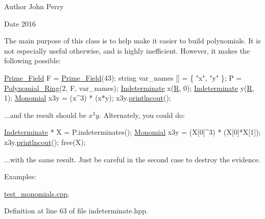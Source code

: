 \begin{DoxyAuthor}{Author}
John Perry
\end{DoxyAuthor}
\begin{DoxyDate}{Date}
2016
\end{DoxyDate}
The main purpose of this class is to help make it easier to build polynomials. It is not especially useful otherwise, and is highly inefficient. However, it makes the following possible\+: 
\begin{DoxyCode}
\hyperlink{group___fields_group_class_prime___field}{Prime\_Field} F = \hyperlink{group___fields_group_class_prime___field}{Prime\_Field}(43);
\textcolor{keywordtype}{string} var\_names [] = \{ \textcolor{stringliteral}{"x"}, \textcolor{stringliteral}{"y"} \};
P = \hyperlink{group__polygroup_class_polynomial___ring}{Polynomial\_Ring}(2, F, var\_names);
\hyperlink{group__polygroup_class_indeterminate}{Indeterminate} x(\hyperlink{group__polygroup_a78f5339712602f11e29a091d228032c4}{R}, 0);
\hyperlink{group__polygroup_class_indeterminate}{Indeterminate} y(\hyperlink{group__polygroup_a78f5339712602f11e29a091d228032c4}{R}, 1);
\hyperlink{group__polygroup_class_monomial}{Monomial} x3y = (x^3) * (x*y);
x3y.\hyperlink{group__polygroup_a339f1927077ab6d92b050d222d945f72}{printlncout}();
\end{DoxyCode}
 {$\dots$}and the result should be $x^3y$. Alternately, you could do\+: 
\begin{DoxyCode}
\hyperlink{group__polygroup_class_indeterminate}{Indeterminate} * X = P.indeterminates();
\hyperlink{group__polygroup_class_monomial}{Monomial} x3y = (X[0]^3) * (X[0]*X[1]);
x3y.\hyperlink{group__polygroup_a339f1927077ab6d92b050d222d945f72}{printlncout}();
free(X);
\end{DoxyCode}
 {$\dots$}with the same result. Just be careful in the second case to destroy the evidence. \begin{Desc}
\item[Examples\+: ]\par
\hyperlink{test_monomials_8cpp-example}{test\+\_\+monomials.\+cpp}.\end{Desc}


Definition at line 63 of file indeterminate.\+hpp.

